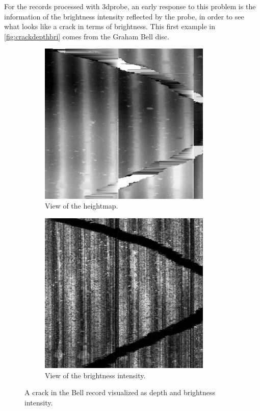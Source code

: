 For the records processed with \gls{3dprobe}, an early response to this problem is the information of the brightness intensity reflected by the probe, in order to see what looks like a crack in terms of brightness. This first example in \autoref{fig:crackdepthbri} comes from the Graham Bell disc.

\begin{figure}[!ht]
    \centering
    \begin{subfigure}[t]{0.45\textwidth}
    \centering
    \includegraphics[width=0.9\textwidth]{images/bell-crack-raw}
    \caption{View of the heightmap.}
    \label{fig:crackdepth}
    \end{subfigure}
    \begin{subfigure}[t]{0.45\textwidth}
    \centering
    \includegraphics[width=0.9\textwidth]{images/bell-crack-bri}
    \caption{View of the brightness intensity.}
    \label{fig:crackbri}
    \end{subfigure}
    \caption{A crack in the Bell record visualized as depth and brightness intensity.}
    \label{fig:crackdepthbri}
\end{figure}

